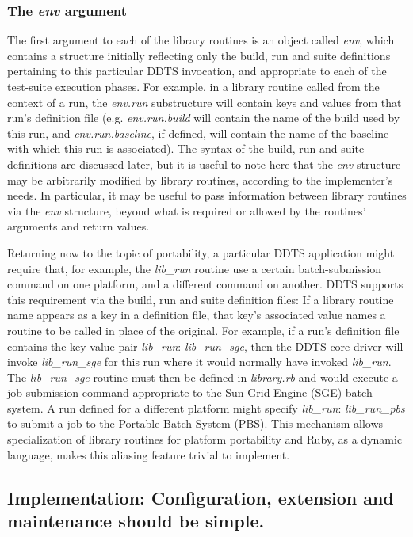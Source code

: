 \documentclass[conference]{IEEEtran}
\begin{document}
\subsubsection{The \emph{env} argument}
The first argument to each of the library routines is an object called \emph{env}, which contains a structure initially reflecting only the build, run and suite definitions pertaining to this particular DDTS invocation, and appropriate to each of the test-suite execution phases. For example, in a library routine called from the context of a run, the \emph{env.run} substructure will contain keys and values from that run's definition file (e.g. \emph{env.run.build} will contain the name of the build used by this run, and \emph{env.run.baseline}, if defined, will contain the name of the baseline with which this run is associated). The syntax of the build, run and suite definitions are discussed later, but it is useful to note here that the \emph{env} structure may be arbitrarily modified by library routines, according to the implementer's needs. In particular, it may be useful to pass information between library routines via the \emph{env} structure, beyond what is required or allowed by the routines' arguments and return values.

Returning now to the topic of portability, a particular DDTS application might require that, for example, the \emph{lib\_run} routine use a certain batch-submission command on one platform, and a different command on another. DDTS supports this requirement via the build, run and suite definition files: If a library routine name appears as a key in a definition file, that key's associated value names a routine to be called in place of the original. For example, if a run's definition file contains the key-value pair \emph{lib\_run}: \emph{lib\_run\_sge}, then the DDTS core driver will invoke \emph{lib\_run\_sge} for this run where it would normally have invoked \emph{lib\_run}. The \emph{lib\_run\_sge} routine must then be defined in \emph{library.rb} and would execute a job-submission command appropriate to the Sun Grid Engine (SGE) batch system. A run defined for a different platform might specify \emph{lib\_run}: \emph{lib\_run\_pbs} to submit a job to the Portable Batch System (PBS). This mechanism allows specialization of library routines for platform portability and Ruby, as a dynamic language, makes this aliasing feature trivial to implement.

\subsection{Implementation: Configuration, extension and maintenance should be simple.}
\end{document}
